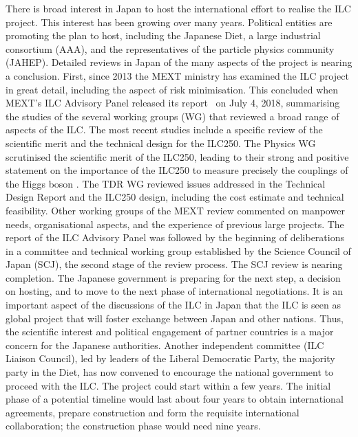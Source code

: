 There is broad interest in Japan to host the
international effort to realise the ILC project.  
This interest has been growing over many years.
Political entities are promoting the plan to host,
including the Japanese Diet,
a large industrial consortium (AAA),
and the representatives of the particle physics community (JAHEP).
Detailed reviews in Japan of the many aspects of the
project is nearing a conclusion.
First,
since 2013 the MEXT ministry has examined the ILC project in
great detail, including the aspect of risk minimisation.
This concluded when
MEXT's ILC Advisory Panel released 
its report~\cite{AdvPanel} on July 4, 2018, summarising the
studies of the several working groups (WG) that
reviewed 
a broad range of aspects of the ILC.  The most recent studies include
a specific review of the scientific merit and the technical design for the ILC250. 
The  Physics WG scrutinised the scientific merit of the ILC250,
leading to their strong and positive statement on the importance of
the ILC250 to 
measure precisely the couplings of the Higgs boson \cite{AdvPanel}.
The TDR WG reviewed issues addressed in the Technical Design Report
and the ILC250 design, including the  cost estimate and technical feasibility.  
Other working groups of the MEXT review commented on manpower needs, 
organisational aspects, and the experience of previous large projects.
The report of the ILC Advisory Panel was followed by the beginning of
deliberations in a committee and technical working group 
established by the Science Council of Japan (SCJ),
the second stage of the review process. 
The SCJ review is nearing completion.
  The Japanese government is preparing for the next step,
a decision on hosting, and to move to the next phase of international negotiations.
It is an important aspect of the discussions of the ILC in Japan that the
ILC is seen as global project that will foster exchange between Japan
and other nations.   Thus, the  
scientific interest and political engagement of partner countries is a
major 
concern for the Japanese authorities.  
Another independent committee (ILC Liaison Council),
led by leaders of the Liberal Democratic 
Party, the majority party in the Diet,  has now 
convened to encourage the national government to proceed with the ILC.
The project could start within a few years. 
The initial phase of a potential timeline 
would last about four years to obtain
 international agreements, prepare construction and form 
 the requisite international
collaboration; the construction phase would need nine years.



